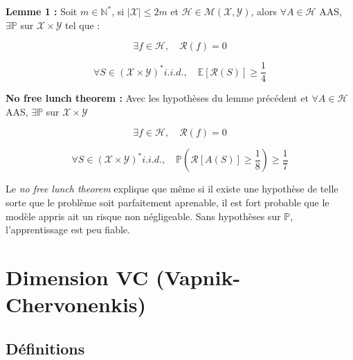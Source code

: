 \noindent \textbf{Lemme 1 :} Soit $m \in \mathbb{N}^{*}$, si $|\mathcal{X}| \leq 2m$ et $\mathcal{H} \in \mathcal{M}(\mathcal{X}, \mathcal{Y})$,
alors $\forall A \in \mathcal{H}$ AAS, $\exists \mathbb{P}$ sur $\mathcal{X} \times \mathcal{Y}$ tel que : 

\begin{equation}
    \exists f \in \mathcal{H}, \quad \mathcal{R}(f) = 0 \nonumber
\end{equation}

\begin{equation}
    \forall S \in (\mathcal{X} \times \mathcal{Y})^* i.i.d., \quad \mathbb{E}[\mathcal{R}(S)] \geq \frac{1}{4} \nonumber
\end{equation}

\noindent \textbf{No free lunch theorem : } Avec les hypothèses du lemme précédent et $\forall A \in \mathcal{H}$ AAS, $\exists \mathbb{P}$ sur $\mathcal{X} \times \mathcal{Y}$

\begin{equation}
    \exists f \in \mathcal{H}, \quad \mathcal{R}(f) = 0 \nonumber
\end{equation}

\begin{equation}
    \forall S \in (\mathcal{X} \times \mathcal{Y})^* i.i.d., \quad \mathbb{P}(\mathcal{R}[A(S)] \geq \frac{1}{8}) \geq \frac{1}{7} \nonumber
\end{equation}

\noindent Le \textit{no free lunch theorem} explique que même si il existe une hypothèse de telle sorte que le problème soit parfaitement aprenable, il est fort probable que
le modèle appris ait un risque non négligeable. Sans hypothèses sur $\mathbb{P}$, l'apprentissage est peu fiable.

\newpage

\section{Dimension VC (Vapnik-Chervonenkis)}
\subsection{Définitions}


